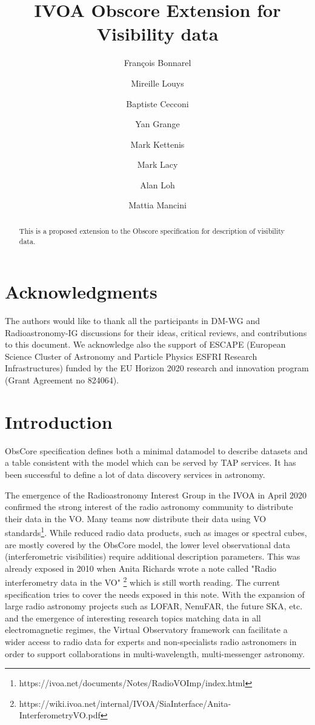 \documentclass[11pt,a4paper]{ivoa}
\title{IVOA Obscore Extension for Visibility data}
\author{Fran\c cois Bonnarel}
\author{Mireille Louys}
\author{Baptiste Cecconi}
\author{Yan Grange}
\author{Mark Kettenis}
\author{Mark Lacy}
\author{Alan Loh}
\author{Mattia Mancini}
\begin{document}
\begin{abstract}
This is a proposed extension to the Obscore specification for description of visibility data.
\end{abstract}

\section*{Acknowledgments}

The authors would like to thank all the participants in DM-WG and Radioastronomy-IG discussions 
for their ideas, critical reviews, and contributions to this document.
We acknowledge also the support of ESCAPE (European Science Cluster of Astronomy
and Particle Physics ESFRI Research Infrastructures) funded by the EU Horizon
2020 research and innovation program (Grant Agreement no 824064).

\section{Introduction}


ObsCore specification \citep{std:OBSCORE} defines both a minimal datamodel to describe datasets 
and a table consistent with the model which can be served by TAP services. It has been successful 
to define a lot of data discovery services in astronomy.

The emergence of the Radioastronomy Interest Group in the IVOA in April 2020 confirmed the strong 
interest of the radio astronomy community to distribute their data in the VO. Many teams now 
distribute their data using VO standards\footnote{https://ivoa.net/documents/Notes/RadioVOImp/index.html}. 
While reduced radio data products, such as images or spectral cubes, %
are mostly covered by the ObsCore model, the lower level observational data 
(interferometric visibilities) require additional description parameters. This was already exposed 
in 2010 when Anita Richards wrote a note called "Radio interferometry data in the VO" 
\footnote{https://wiki.ivoa.net/internal/IVOA/SiaInterface/Anita-InterferometryVO.pdf} which is 
still worth reading. The current specification tries to cover the needs exposed in this note. 
With the expansion of large radio astronomy projects such as LOFAR, NenuFAR, the future SKA, etc. 
and the emergence of interesting research topics matching data in all electromagnetic regimes, the 
Virtual Observatory framework can facilitate a wider access to radio data for experts and 
non-specialists radio astronomers in order to support collaborations in multi-wavelength, 
multi-messenger astronomy. 
\end{document}
